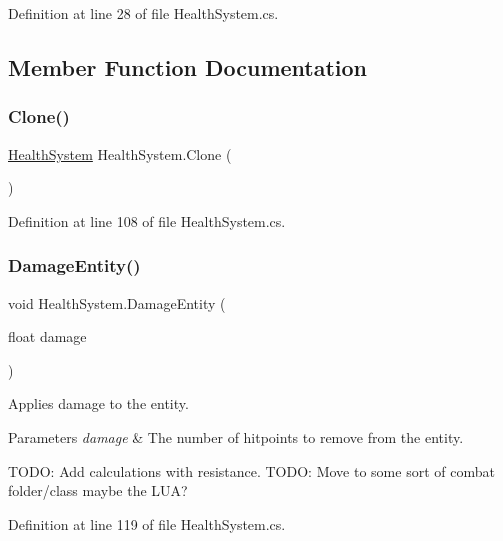 Definition at line 28 of file Health\+System.\+cs.



\subsection{Member Function Documentation}
\mbox{\label{class_health_system_a0f6e79635da6cf8a3a9493fc422f3fcb}} 
\subsubsection{\texorpdfstring{Clone()}{Clone()}}
{\footnotesize\ttfamily \hyperlink{class_health_system}{Health\+System} Health\+System.\+Clone (\begin{DoxyParamCaption}{ }\end{DoxyParamCaption})}



Definition at line 108 of file Health\+System.\+cs.

\mbox{\label{class_health_system_a5b63bccbb8a3da90a8e87f75e904e572}} 
\subsubsection{\texorpdfstring{Damage\+Entity()}{DamageEntity()}}
{\footnotesize\ttfamily void Health\+System.\+Damage\+Entity (\begin{DoxyParamCaption}\item[{float}]{damage }\end{DoxyParamCaption})}



Applies damage to the entity. 


\begin{DoxyParams}{Parameters}
{\em damage} & The number of hitpoints to remove from the entity.\\
\hline
\end{DoxyParams}
T\+O\+DO\+: Add calculations with resistance. T\+O\+DO\+: Move to some sort of combat folder/class maybe the L\+UA? 

Definition at line 119 of file Health\+System.\+cs.

